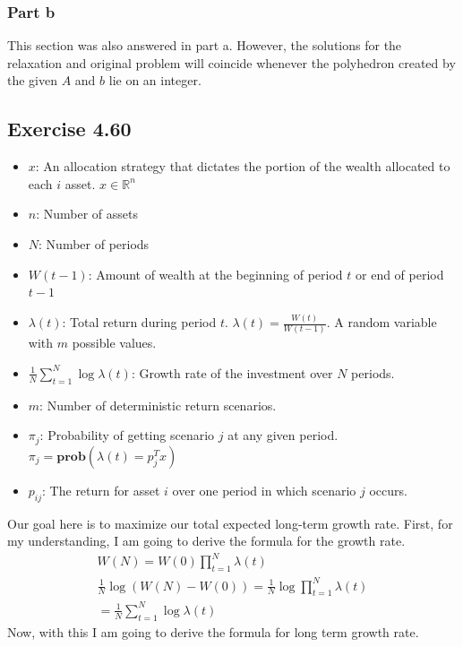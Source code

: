 \subsubsection{Part b}
This section was also answered in part a. However, the solutions for the relaxation and original problem will coincide whenever the polyhedron created by the given $A$ and $b$ lie on an integer.

\subsection{Exercise 4.60}
\begin{itemize}
  \item $x$: An allocation strategy that dictates the portion of the wealth allocated to each $i$ asset. $x \in \mathbb{R}^n$
  \item $n$: Number of assets
  \item $N$: Number of periods
  \item $W(t-1)$: Amount of wealth at the beginning of period $t$ or end of period $t-1$
  \item $\lambda(t)$: Total return during period $t$. $\lambda(t) = \frac{W(t)}{W(t-1)}$. A random variable with $m$ possible values.
  \item $\frac{1}{N} \sum_{t=1}^{N} \log \lambda(t)$: Growth rate of the investment over $N$ periods.
  \item $m$: Number of deterministic return scenarios.
  \item $\pi_j$: Probability of getting scenario $j$ at any given period. $\pi_j = \textbf{prob}(\lambda(t) = p_j^T x)$
  \item $p_{ij}$: The return for asset $i$ over one period in which scenario $j$ occurs.
\end{itemize}

Our goal here is to maximize our total expected long-term growth rate. First, for my understanding, I am going to derive the formula for the growth rate.
\begin{equation}
  \begin{aligned}
    W(N) = W(0) \prod_{t=1}^{N} \lambda(t) \\
    \frac{1}{N} \log (W(N) - W(0)) = \frac{1}{N} \log \prod_{t=1}^{N} \lambda(t) \\
    = \frac{1}{N} \sum_{t=1}^N \log \lambda(t)
  \end{aligned}
\end{equation}
Now, with this I am going to derive the formula for long term growth rate.

